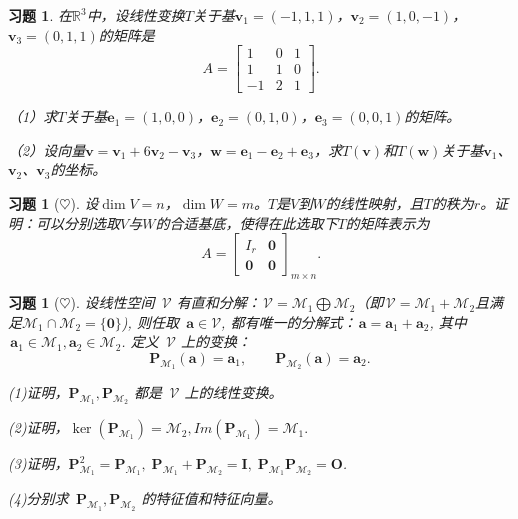 \documentclass[UTF8]{ctexart}
\newtheorem{ex}[thm]{习题}
\begin{document}
		
\begin{ex}
	在$\mathbb{R}^3$中，设线性变换$T$关于基$\mathbf{v}_1=(-1,1,1)$，$\mathbf{v}_2=(1,0,-1)$，$\mathbf{v}_3=(0,1,1)$的矩阵是
	$$\,A = \left[\begin{array}{rrr} 
	1 & 0 & 1\\ 
	1 & 1 & 0\\
	-1 & 2 & 1
	\end{array}\right].$$ 	
	
	（1）求$T$关于基$\mathbf{e}_1=(1,0,0)$，$\mathbf{e}_2=(0,1,0)$，$\mathbf{e}_3=(0,0,1)$的矩阵。
	
	（2）设向量$\mathbf{v}=\mathbf{v}_1+6\mathbf{v}_2-\mathbf{v}_3$，$\mathbf{w}=\mathbf{e}_1-\mathbf{e}_2+\mathbf{e}_3$，求$T(\mathbf{v})$和$T(\mathbf{w})$关于基$\mathbf{v}_1$、$\mathbf{v}_2$、$\mathbf{v}_3$的坐标。
\end{ex}



\begin{ex}[$\heartsuit $]
设$\dim V=n$，$\dim W=m$。$T$是$V$到$W$的线性映射，且$T$的秩为$r$。证明：可以分别选取$V$与$W$的合适基底，使得在此选取下$T$的矩阵表示为
$$\,A = \left[\begin{array}{cc} 
I_r & \mathbf{0}\\ 
\mathbf{0}& \mathbf{0}
\end{array}\right]_{m\times n}.$$ 	
\end{ex}



	
	
\begin{ex}[$\heartsuit $]
	设线性空间 $\,\mathcal{V}$ 有直和分解：$\,\mathcal{V} = \mathcal{M}_1 \bigoplus \mathcal{M}_2$（即$\,\mathcal{V} = \mathcal{M}_1 + \mathcal{M}_2$且满足$\mathcal{M}_1 \cap \mathcal{M}_2=\{\boldsymbol{0}\}$), 则任取 $\,\boldsymbol{a} \in \mathcal{V}$, 都有唯一的分解式：$\,\boldsymbol{a} = \boldsymbol{a}_1 + \boldsymbol{a}_2$, 其中 $\,\boldsymbol{a}_1 \in \mathcal{M}_1, \boldsymbol{a}_2 \in \mathcal{M}_2$. 定义 $\,\mathcal{V}$ 上的变换：
	$$ 
	\boldsymbol{P}_{\mathcal{M}_1}(\boldsymbol{a}) = \boldsymbol{a}_1, \qquad \boldsymbol{P}_{\mathcal{M}_2}(\boldsymbol{a}) = \boldsymbol{a}_2.
	$$
	
	(1)证明，$\boldsymbol{P}_{\mathcal{M}_1}, \boldsymbol{P}_{\mathcal{M}_2}$ 都是 $\,\mathcal{V}$ 上的线性变换。
	
	(2)证明，$\ker(\boldsymbol{P}_{\mathcal{M}_1}) = \mathcal{M}_2, Im(\boldsymbol{P}_{\mathcal{M}_1}) = \mathcal{M}_1.$
	
	(3)证明，$\boldsymbol{P}_{\mathcal{M}_1}^2 = \boldsymbol{P}_{\mathcal{M}_1},\; \boldsymbol{P}_{\mathcal{M}_1} + \boldsymbol{P}_{\mathcal{M}_2} = \boldsymbol{I},\; \boldsymbol{P}_{\mathcal{M}_1}\boldsymbol{P}_{\mathcal{M}_2} = \boldsymbol{O}$.
	
	(4)分别求 $\,\boldsymbol{P}_{\mathcal{M}_1}, \boldsymbol{P}_{\mathcal{M}_2}$ 的特征值和特征向量。
\end{ex}
\end{document}
